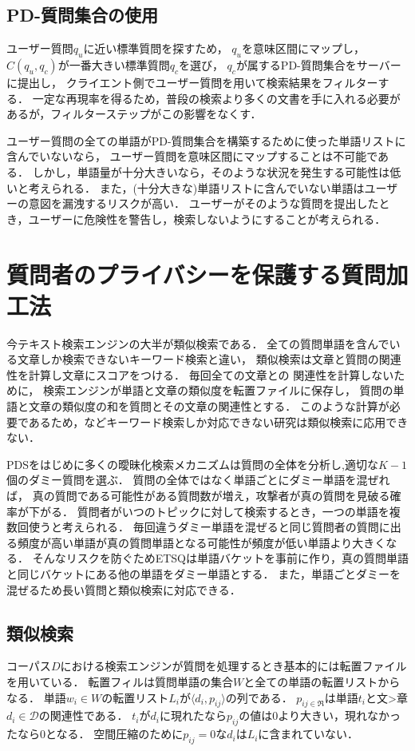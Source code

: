 \documentclass[master]{suribt}
\theoremstyle{definition}
\begin{document}
 \subsection{PD-質問集合の使用}
 ユーザー質問$q_u$に近い標準質問を探すため，
 $q_u$を意味区間にマップし，
 $C(q_u,q_c)$が一番大きい標準質問$q_c$を選び，
 $q_c$が属するPD-質問集合をサーバーに提出し，
 クライエント側でユーザー質問を用いて検索結果をフィルターする．
 一定な再現率を得るため，普段の検索より多くの文書を手に入れる必要があるが，フィルターステップがこの影響をなくす．

 ユーザー質問の全ての単語がPD-質問集合を構築するために使った単語リストに含んでいないなら，
 ユーザー質問を意味区間にマップすることは不可能である．
 しかし，単語量が十分大きいなら，そのような状況を発生する可能性は低いと考えられる．
 また，(十分大きな)単語リストに含んでいない単語はユーザーの意図を漏洩するリスクが高い．
 ユーザーがそのような質問を提出したとき，ユーザーに危険性を警告し，検索しないようにすることが考えられる．

 \section{質問者のプライバシーを保護する質問加工法} \label{s:ETSQ}
 今テキスト検索エンジンの大半が類似検索である．
 全ての質問単語を含んでいる文章しか検索できないキーワード検索と違い，
 類似検索は文章と質問の関連性を計算し文章にスコアをつける\cite{if2006}．
 毎回全ての文章との 関連性を計算しないために，
 検索エンジンが単語と文章の類似度を転置ファイルに保存し，
 質問の単語と文章の類似度の和を質問とその文章の関連性とする．
 このような計算が必要であるため，\cite{pss2006,opf2005,pke2004,soe2000}などキーワード検索しか対応できない研究は類似検索に応用できない．

 PDSをはじめに多くの曖昧化検索メカニズム\cite{masking2014,praw2005,goo2009}は質問の全体を分析し,適切な$K−1$個のダミー質問を選ぶ．
 質問の全体ではなく単語ごとにダミー単語を混ぜれば，
 真の質問である可能性がある質問数が増え，攻撃者が真の質問を見破る確率が下がる．
 質問者がいつのトピックに対して検索するとき，一つの単語を複数回使うと考えられる．
 毎回違うダミー単語を混ぜると同じ質問者の質問に出る頻度が高い単語が真の質問単語となる可能性が頻度が低い単語より大きくなる．
 そんなリスクを防ぐためETSQは単語バケットを事前に作り，真の質問単語と同じバケットにある他の単語をダミー単語とする．
 また，単語ごとダミーを混ぜるため長い質問と類似検索に対応できる．

 \subsection{類似検索}
 コーパス$D$における検索エンジンが質問を処理するとき基本的には転置ファイルを用いている．
 転置フィルは質問単語の集合$W$と全ての単語の転置リストからなる．
 単語$w_i \in W$の転置リスト$L_i$が$\langle d_i,p_{ij}\rangle$の列である．
 $p_{ij \in \Re}$は単語$t_i$と文>章$d_i \in \mathcal{D}$の関連性である．
 $t_i$が$d_i$に現れたなら$p_{ij}$の値は$0$より大きい，現れなかったなら$0$となる．
 空間圧縮のために$p_{ij}=0$な$d_i$は$L_i$に含まれていない．
\end{document}
